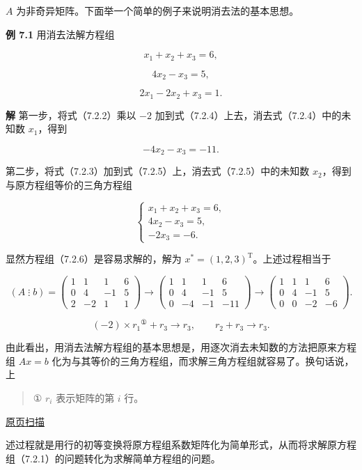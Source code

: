 \documentclass[
  10pt,
  fontset=fandol]{ctexart}
\begin{document}
\(A\) 为非奇异矩阵。下面举一个简单的例子来说明消去法的基本思想。

\textbf{例 7.1} 用消去法解方程组

\[x_1+x_2+x_3=6,\tag{7.2.2}\]

\[4x_2-x_3=5,\tag{7.2.3}\]

\[2x_1-2x_2+x_3=1.\tag{7.2.4}\]

\textbf{解} 第一步，将式（7.2.2）乘以 \(-2\) 加到式（7.2.4）上去，消去式（7.2.4）中的未知数 \(x_1\)，得到

\[-4x_2-x_3=-11.\tag{7.2.5}\]

第二步，将式（7.2.3）加到式（7.2.5）上，消去式（7.2.5）中的未知数 \(x_2\)，得到与原方程组等价的三角方程组

\[
\begin{cases}
x_1+x_2+x_3=6,\\
4x_2-x_3=5,\\
-2x_3=-6.
\end{cases}
\tag{7.2.6}
\]

显然方程组（7.2.6）是容易求解的，解为 \(x^*=(1,2,3)^{\mathrm T}\)。上述过程相当于

\[
(A\mathbin{\vdots}b)=
\left(\begin{array}{rrr|r}1&1&1&6\\0&4&-1&5\\2&-2&1&1\end{array}\right)
\longrightarrow
\left(\begin{array}{rrr|r}1&1&1&6\\0&4&-1&5\\0&-4&-1&-11\end{array}\right)
\longrightarrow
\left(\begin{array}{rrr|r}1&1&1&6\\0&4&-1&5\\0&0&-2&-6\end{array}\right).
\]

\[(-2)\times r_1{}^{\text{①}}+r_3\to r_3,\qquad r_2+r_3\to r_3.\]

由此看出，用消去法解方程组的基本思想是，用逐次消去未知数的方法把原来方程组 \(Ax=b\) 化为与其等价的三角方程组，而求解三角方程组就容易了。换句话说，上

\begin{quote}
① \(r_i\) 表示矩阵的第 \(i\) 行。
\end{quote}

\href{../../source-images/pdf-179.jpeg}{原页扫描}

述过程就是用行的初等变换将原方程组系数矩阵化为简单形式，从而将求解原方程组（7.2.1）的问题转化为求解简单方程组的问题。
\end{document}
